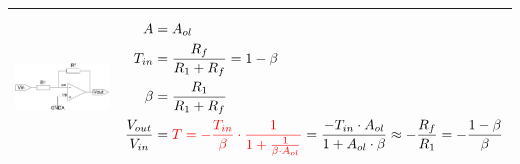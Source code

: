 \begin{longtable}[t]{|p{5cm}|p{12.7cm}|}
    \includegraphics[width=5cm]{pictures/OPInv.png}
    & {\vspace{-1.5\topsep}
        \begin{align*}
            A &= A_{ol}\\
            T_{in} &= \frac{R_f}{R_1 + R_f} = 1 - \beta\\
            \beta &= \frac{R_1}{R_1 + R_f}\\
            \frac{V_{out}}{V_{in}} &= \textcolor{red}{T = -\frac{T_{in}}{\beta}\cdot 
            \frac{1}{1+ \frac{1}{\beta \cdot A_{ol}}}} =
            \frac{-T_{in} \cdot A_{ol}}{1+A_{ol} \cdot \beta}\approx -\frac{R_f}{R_1} = -\frac{1-\beta}{\beta}
        \end{align*}
    }
    \\ \hline
\end{longtable}
\vspace{-2.5\topsep}
